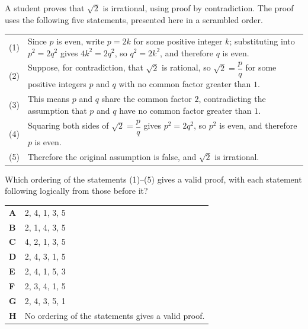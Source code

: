 \documentclass[11pt,a4paper]{article}
\begin{document}
\begin{enumerate}[label=\textbf{\arabic*.},leftmargin=*,itemsep=0pt,start=5]
A student proves that $\sqrt{2}$ is irrational, using proof by contradiction. The proof uses the following five statements, presented here in a scrambled order. \\

\begin{tabular}{@{}r@{\hspace{0.6em}}p{\dimexpr\linewidth-2.6em\relax}@{}}
(1) &
Since $p$ is even, write $p = 2k$ for some positive integer $k$; substituting into $p^2 = 2q^2$ gives $4k^2 = 2q^2$, so $q^2 = 2k^2$, and therefore $q$ is even.
\\[0.8em]

(2) &
Suppose, for contradiction, that $\sqrt{2}$ is rational, so $\sqrt{2} = \dfrac{p}{q}$ for some positive integers $p$ and $q$ with no common factor greater than $1$.
\\[0.8em]

(3) &
This means $p$ and $q$ share the common factor $2$, contradicting the assumption that $p$ and $q$ have no common factor greater than $1$.
\\[0.8em]

(4) &
Squaring both sides of $\sqrt{2} = \dfrac{p}{q}$ gives $p^2 = 2q^2$, so $p^2$ is even, and therefore $p$ is even.
\\[0.8em]

(5) &
Therefore the original assumption is false, and $\sqrt{2}$ is irrational.\\[0.8em]
\end{tabular}

\medskip

Which ordering of the statements (1)--(5) gives a valid proof, with each statement following logically from those before it?

\par\vspace*{12pt}
\begin{tabularx}{\linewidth}{@{}>{\bfseries}l Y@{}}
A &
2, 4, 1, 3, 5
\\[0.8em]
B &
2, 1, 4, 3, 5
\\[0.8em]
C &
4, 2, 1, 3, 5
\\[0.8em]
D &
2, 4, 3, 1, 5
\\[0.8em]
E &
2, 4, 1, 5, 3
\\[0.8em]
F &
2, 3, 4, 1, 5
\\[0.8em]
G &
2, 4, 3, 5, 1
\\[0.8em]
H &
No ordering of the statements gives a valid proof.
\\
\end{tabularx}


\end{enumerate}
\end{document}
